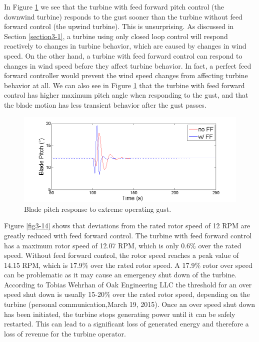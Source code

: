 In Figure \ref{fig3-13} we see that the turbine with feed forward pitch control (the downwind turbine) responds to the gust sooner than the turbine without feed forward control (the upwind turbine). This is unsurprising. As discussed in Section \ref{section3-1}, a turbine using only closed loop control will respond reactively to changes in turbine behavior, which are caused by changes in wind speed. On the other hand, a turbine with feed forward control can respond to changes in wind speed before they affect turbine behavior. In fact, a perfect feed forward controller would prevent the wind speed changes from affecting turbine behavior at all. We can also see in Figure \ref{fig3-13} that the turbine with feed forward control has  higher maximum pitch angle when responding to the gust, and that the blade motion has less transient behavior after the gust passes.

\begin{figure}[htbp]
	\centering
		\includegraphics[trim = {1cm 0 2cm 0}, clip, width = \linewidth]{Figures/ch3Figures/fig3-13.png}
		
	\caption{Blade pitch response to extreme operating gust. }
	\label{fig3-13}
\end{figure}

Figure \ref{fig3-14} shows that deviations from the rated rotor speed of 12 RPM are greatly reduced with feed forward control. The turbine with feed forward control has a maximum rotor speed of 12.07 RPM, which is only 0.6$\%$ over the rated speed. Without feed forward control, the rotor speed reaches a peak value of 14.15 RPM, which is 17.9$\%$ over the rated rotor speed. A 17.9$\%$ rotor over speed can be problematic as it may cause an emergency shut down of the turbine. According to Tobias Wehrhan of Oak Engineering LLC the threshold for an over speed shut down is usually 15-20$\%$ over the rated rotor speed, depending on the turbine (personal communication,March 19, 2015). Once an over speed shut down has been initiated, the turbine stops generating power until it can be safely restarted. This can lead to a significant loss of generated energy and therefore a loss of revenue for the turbine operator.

